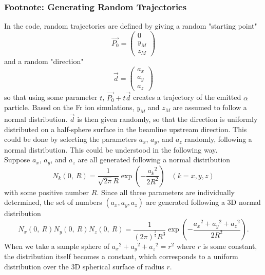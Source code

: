 \documentclass{article}
\begin{document}
\subsubsection*{Footnote: Generating Random Trajectories}
In the code, random trajectories are defined by giving a random "starting point" 
$$
\vec{P_0} = \left(
\begin{array}{c}
	0 \\
	y_M \\
	z_M
\end{array} \right)
$$
and a random "direction" 
$$
\vec{d} = \left(
\begin{array}{c}
	a_x \\
	a_y \\
	a_z
\end{array} \right)
$$
so that using some parameter $t$, $\vec{P_0} + t\vec{d}$ creates a trajectory of the emitted $\alpha$ particle. Based on the Fr ion simulations, $y_M$ and $z_M$ are assumed to follow a normal distribution. $\vec{d}$ is then given randomly, so that the direction is uniformly distributed on a half-sphere surface in the beamline upstream direction. This could be done by selecting the parameters $a_x$, $a_y$, and $a_z$ randomly, following a normal distribution\cite{Muller1959}. This could be understood in the following way. \\

Suppose $a_x$, $a_y$, and $a_z$ are all generated following a normal distribution
$$
N_k(0,\ R) = \frac{1}{\sqrt{2\pi}R}\exp{\left(-\frac{{a_k}^2}{2R^2}\right)}\, \, \, \, \, (k = x, y, z)
$$
with some positive number $R$. Since all three parameters are individually determined, the set of numbers $(a_x, a_y, a_z)$ are generated following a 3D normal distribution
$$
N_x(0,\ R) N_y(0,\ R) N_z(0,\ R) = \frac{1}{(2\pi)^\frac{3}{2} R^3} \exp{\left(-\frac{{a_x}^2 + {a_y}^2 + {a_z}^2}{2R^2}\right)}.
$$
When we take a sample sphere of ${a_x}^2 + {a_y}^2 + {a_z}^2 = r^2$ where $r$ is some constant, the distribution itself becomes a constant, which corresponds to a uniform distribution over the 3D spherical surface of radius $r$. \\
\end{document}

